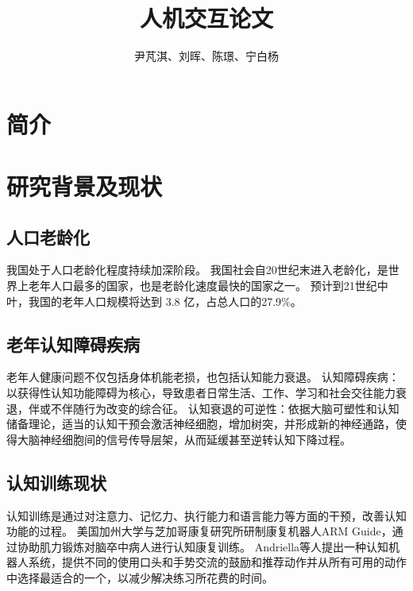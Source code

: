 \documentclass{article}
\author{尹芃淇、刘晖、陈璟、宁白杨}
\title{人机交互论文}
\begin{document}
    \maketitle
    \section{简介}
        \subsection{}
            \subsubsection{}
    \section{研究背景及现状}
        \subsection{人口老龄化}
        我国处于人口老龄化程度持续加深阶段。
        我国社会自20世纪末进入老龄化，是世界上老年人口最多的国家，也是老龄化速度最快的国家之一。
        预计到21世纪中叶，我国的老年人口规模将达到 3.8 亿，占总人口的27.9\%。
        
        \subsection{老年认知障碍疾病}

        老年人健康问题不仅包括身体机能老损，也包括认知能力衰退。
        认知障碍疾病：以获得性认知功能障碍为核心，导致患者日常生活、工作、学习和社会交往能力衰退，伴或不伴随行为改变的综合征。
        认知衰退的可逆性：依据大脑可塑性和认知储备理论，适当的认知干预会激活神经细胞，增加树突，并形成新的神经通路，使得大脑神经细胞间的信号传导层架，从而延缓甚至逆转认知下降过程。

        \subsection{认知训练现状}

        认知训练是通过对注意力、记忆力、执行能力和语言能力等方面的干预，改善认知功能的过程。
        美国加州大学与芝加哥康复研究所研制康复机器人ARM Guide，通过协助肌力锻炼对脑卒中病人进行认知康复训练。
        Andriella等人提出一种认知机器人系统，提供不同的使用口头和手势交流的鼓励和推荐动作并从所有可用的动作中选择最适合的一个，以减少解决练习所花费的时间。
\end{document}
